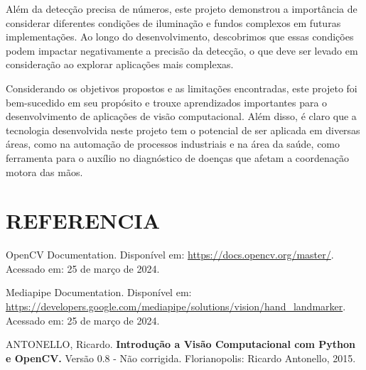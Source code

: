 \documentclass[12pt,a4paper]{article}
\begin{document}
        Além da detecção precisa de números, este projeto demonstrou a importância de considerar diferentes condições de iluminação e fundos complexos em futuras implementações. Ao longo do desenvolvimento, descobrimos que essas condições podem impactar negativamente a precisão da detecção, o que deve ser levado em consideração ao explorar aplicações mais complexas.

        Considerando os objetivos propostos e as limitações encontradas, este projeto foi bem-sucedido em seu propósito e trouxe aprendizados importantes para o desenvolvimento de aplicações de visão computacional. Além disso, é claro que a tecnologia desenvolvida neste projeto tem o potencial de ser aplicada em diversas áreas, como na automação de processos industriais e na área da saúde, como ferramenta para o auxílio no diagnóstico de doenças que afetam a coordenação motora das mãos.

    \section*{REFERENCIA}

        \noindent OpenCV Documentation. Disponível em: \url{https://docs.opencv.org/master/}. Acessado em: 25 de março de 2024.
        
        \noindent Mediapipe Documentation. Disponível em: \url{https://developers.google.com/mediapipe/solutions/vision/hand_landmarker}. Acessado em: 25 de março de 2024.

        \noindent ANTONELLO, Ricardo. \textbf{Introdução a Visão Computacional com Python e OpenCV.} Versão 0.8 - Não corrigida. Florianopolis: Ricardo Antonello, 2015.

        
\end{document}
